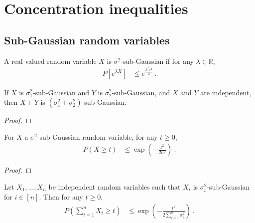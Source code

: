 \chapter{Concentration inequalities}


\section{Sub-Gaussian random variables}

\begin{definition}\label{def:subGaussian}
  \mathlibok
A real valued random variable $X$ is $\sigma^2$-sub-Gaussian if for any $\lambda \in \mathbb{R}$,
\begin{align*}
  P\left[e^{\lambda X}\right]
  &\le e^{\frac{\lambda^2 \sigma^2}{2}}
  \: .
\end{align*}
\end{definition}


\begin{lemma}\label{lem:subGaussian_add_of_indepFun}
  \mathlibok
If $X$ is $\sigma_1^2$-sub-Gaussian and $Y$ is $\sigma_2^2$-sub-Gaussian, and $X$ and $Y$ are independent, then $X + Y$ is $(\sigma_1^2 + \sigma_2^2)$-sub-Gaussian.
\end{lemma}

\begin{proof}\leanok

\end{proof}


\begin{lemma}\label{lem:hoeffding_one}
  \mathlibok
For $X$ a $\sigma^2$-sub-Gaussian random variable, for any $t \ge 0$,
\begin{align*}
  P(X \ge t)
  &\le \exp\left(- \frac{t^2}{2 \sigma^2}\right)
  \: .
\end{align*}
\end{lemma}

\begin{proof}\leanok

\end{proof}


\begin{theorem}\label{thm:hoeffding}
  \mathlibok
Let $X_1, \ldots, X_n$ be independent random variables such that $X_i$ is $\sigma_i^2$-sub-Gaussian for $i \in [n]$.
Then for any $t \ge 0$,
\begin{align*}
  P\left(\sum_{i=1}^n X_i \ge t\right)
  &\le \exp\left(- \frac{t^2}{2 \sum_{i=1}^n \sigma_i^2}\right)
  \: .
\end{align*}
\end{theorem}

